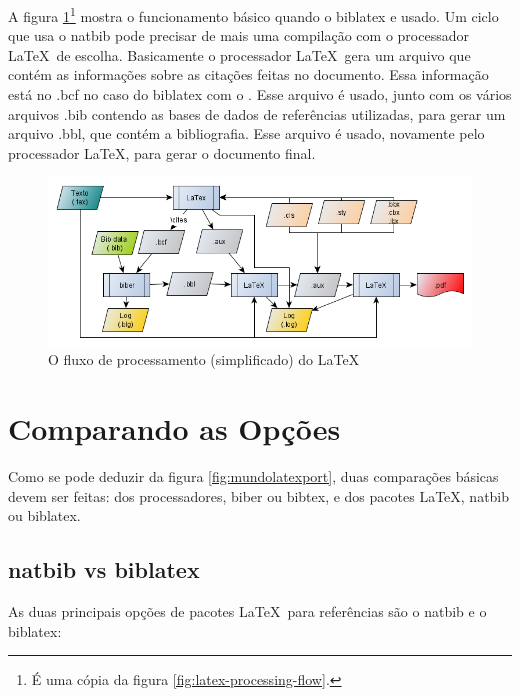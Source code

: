 A figura \ref{fig:latex-processing-flow2}\footnote{É uma cópia da figura \ref{fig:latex-processing-flow}.} mostra o funcionamento básico quando o biblatex e usado. Um ciclo que usa o natbib pode precisar de mais uma compilação com o processador \LaTeX\  de escolha. Basicamente o processador \LaTeX\   gera um arquivo que contém as informações sobre as citações feitas no documento. Essa informação está no .bcf no caso do biblatex com o . Esse arquivo é usado, junto com os vários arquivos .bib contendo as bases de dados de referências utilizadas, para gerar um arquivo .bbl, que contém a bibliografia. Esse arquivo é usado, novamente pelo processador \LaTeX, para gerar o documento final. 


\begin{figure}[hbt]
    \centering
    \includegraphics[width=0.8\linewidth]{"Images/LaTeX processing flow"}
    \caption{O fluxo de processamento (simplificado) do \LaTeX}
    \label{fig:latex-processing-flow2}
\end{figure}

\section{Comparando as Opções}

Como se pode deduzir da figura \ref{fig:mundolatexport}, duas comparações básicas devem ser feitas: dos processadores, biber ou bibtex, e dos pacotes \LaTeX, natbib ou biblatex.

\subsection{natbib vs biblatex}

As duas principais opções de pacotes \LaTeX\    
para referências são o natbib e o biblatex\parencite{biber:2012}:



